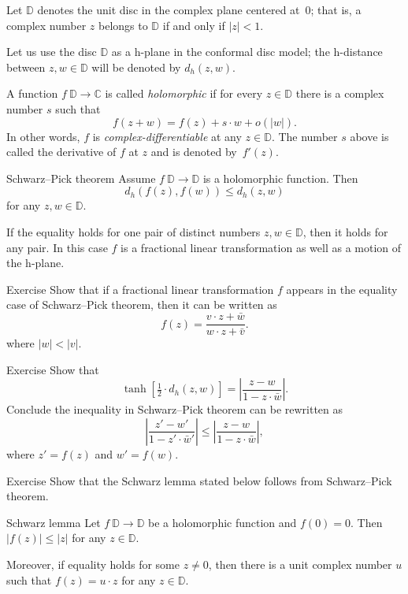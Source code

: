 Let $\mathbb{D}$ denotes the unit disc in the complex plane centered at~$0$;
that is, a complex number $z$
belongs to $\mathbb{D}$ if and only if $|z|<1$.

Let us use the disc $\mathbb{D}$ as a h-plane in the conformal disc model;
the h-distance between $z, w\in\mathbb{D}$ will be denoted by $d_h(z,w)$.

A function $f\:\mathbb{D}\to \mathbb{C}$ is called \emph{holomorphic} if for every $z\in \mathbb{D}$
there is a complex number $s$ such that
\[f(z+w)=f(z)+s\cdot w+o(|w|).\]
In other words, $f$ is {}\emph{complex-differentiable}
at any $z\in\mathbb{D}$.
The number $s$ above is called the derivative of $f$ at $z$ and is denoted by~$f'(z)$.

\begin{thm}{Schwarz--Pick theorem}
Assume $f\: \mathbb{D}\to \mathbb{D}$ is a holomorphic function.
Then 
\[d_h(f(z),f(w))\le d_h(z,w)\]
for any $z,w\in \mathbb{D}$.

If the equality holds for one pair of distinct numbers $z,w\in \mathbb{D}$, then it holds for any pair. 
In this case $f$ is a fractional linear transformation as well as a motion of the h-plane.
\end{thm}

\begin{thm}{Exercise}\label{ex:schwarz-moebius}
Show that if a fractional linear transformation $f$ appears in the equality case of Schwarz--Pick theorem, then it can be written as 
\[f(z)=\frac{v\cdot z+\bar w}{w\cdot z+\bar v}.\]
where $|w|<|v|$.
\end{thm}


\begin{thm}{Exercise}\label{ex:schwarz-tanh}
Show that 
\[\tanh [\tfrac12\cdot d_h(z,w)]=\left|\frac{z-w}{1-z\cdot\bar w}\right|.\]
Conclude the inequality in Schwarz--Pick theorem can be rewritten as
\[\left|\frac{z'-w'}{1-z'\cdot\bar w'}\right|\le\left|\frac{z-w}{1-z\cdot\bar w}\right|,\]
where
$z'=f(z)$ and $w'=f(w)$.
\end{thm}


\begin{thm}{Exercise}\label{ex:schwarz}
Show that the Schwarz lemma stated below 
follows from Schwarz--Pick theorem.
\end{thm}

\begin{thm}{Schwarz lemma}
Let $f\: \mathbb{D}\to \mathbb{D}$ be a holomorphic function
and $f(0)=0$.
Then 
$|f(z)|\le |z|$
for any $z\in \mathbb{D}$.

Moreover, if equality holds for some $z\ne 0$, then there is a unit complex number $u$ 
such that 
$f(z)=u\cdot z$
for any $z\in\mathbb{D}$.
\end{thm}






